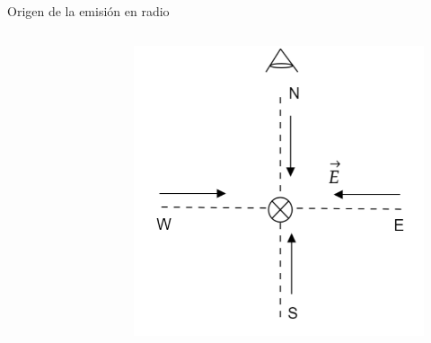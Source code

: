 \documentclass{beamer}
\begin{document}
\begin{frame}{Origen de la emisión en radio}
\begin{columns}
\begin{figure}[H]
\end{figure}
\begin{figure}[H]
	\centering
	\includegraphics[width=.6\linewidth]{figures/Askaryan_2}
\end{figure}
\end{columns}
\end{frame}
\end{document}
